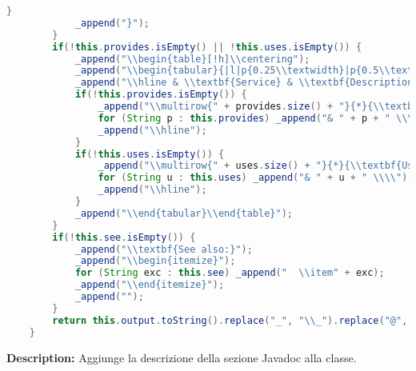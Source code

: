 \begin{lstlisting}[language=Java]
            }
            _append("}");
        }
        if(!this.provides.isEmpty() || !this.uses.isEmpty()) {
            _append("\\begin{table}[!h]\\centering");
            _append("\\begin{tabular}{|l|p{0.25\\textwidth}|p{0.5\\textwidth}|}");
            _append("\\hline & \\textbf{Service} & \\textbf{Description} \\\\ \\hline");
            if(!this.provides.isEmpty()) {
                _append("\\multirow{" + provides.size() + "}{*}{\\textbf{Provides}}");
                for (String p : this.provides) _append("& " + p + " \\\\");
                _append("\\hline");
            }
            if(!this.uses.isEmpty()) {
                _append("\\multirow{" + uses.size() + "}{*}{\\textbf{Uses}}");
                for (String u : this.uses) _append("& " + u + " \\\\");
                _append("\\hline");
            }
            _append("\\end{tabular}\\end{table}");
        }
        if(!this.see.isEmpty()) {
            _append("\\textbf{See also:}");
            _append("\\begin{itemize}");
            for (String exc : this.see) _append("  \\item" + exc);
            _append("\\end{itemize}");
            _append("");
        }
        return this.output.toString().replace("_", "\\_").replace("@", "\\atsign ");
    }
\end{lstlisting}
\vspace{0.5cm}
\textbf{Description:}  Aggiunge la descrizione della sezione Javadoc alla classe. 

